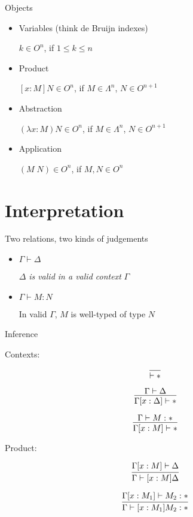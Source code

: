 \documentclass{beamer}
\begin{document}
\begin{frame}{Objects}

\begin{itemize}
\item Variables (think de Bruijn indexes)

\begin{center}
$ k \in O^n$, if $1 \leq k \leq n$
\end{center}
\item Product

\begin{center}
$ [x : M ] N \in O^n$, if  $M \in \Lambda^n$, $N \in O^{n+1} $
\end{center}

\item Abstraction
\begin{center}
$ ( \lambda x : M) N \in O^n $, if $ M \in \Lambda^n$, $N \in O^{n+1}$
\end{center}

\item Application
\begin{center}
$(M \; N) \in O^n$, if $M, N \in O^n$
\end{center}

\end{itemize}
\end{frame}


\section{Interpretation}
\begin{frame}{Two relations, two kinds of judgements}
\begin{itemize}

\item $\Gamma \vdash \Delta$

$\Delta$ \textit{is valid in a valid context } $\Gamma$


\item $\Gamma \vdash M : N$

In valid  $\Gamma$, $M$ is well-typed of type $N$

\end{itemize}

\end{frame}

\begin{frame}{Inference}

Contexts:

$$\infer{\vdash *}{}$$

$$\infer{\Gamma [ x : \Delta ] \vdash *}{\Gamma \vdash \Delta}$$

$$\infer{\Gamma [ x : M ] \vdash *}{\Gamma \vdash M : *}$$

\pause
Product:

$$\infer{\Gamma \vdash [x:M] \Delta}{\Gamma [x:M] \vdash \Delta}$$

$$\infer{\Gamma \vdash [x:M_1] M_2 : * }{\Gamma [x:M_1] \vdash M_2 : *}$$
\end{frame}
\end{document}
